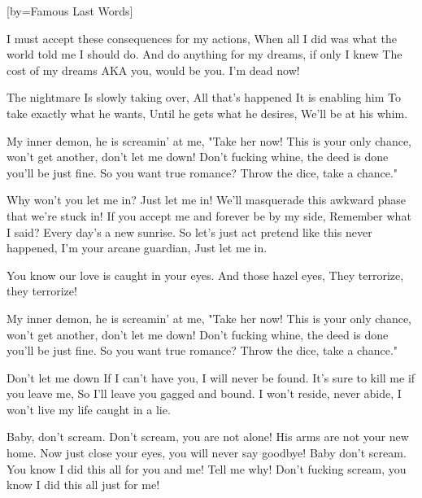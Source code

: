  

[by=Famous Last Words]




\beginverse
[Verse 1]
I must accept these consequences for my actions,
When all I did was what the world told me I should do.
And do anything for my dreams, if only I knew
The cost of my dreams AKA you, would be you.
I'm dead now!
\endverse

The nightmare
Is slowly taking over,
All that's happened
It is enabling him
To take exactly what he wants,
Until he gets what he desires,
We'll be at his whim.
\endchorus

\beginchorus
[Chorus]
My inner demon, he is screamin' at me, "Take her now!
This is your only chance, won't get another, don't let me down!
Don't fucking whine, the deed is done you'll be just fine.
So you want true romance? Throw the dice, take a chance."
\endchorus

\beginverse
[Verse 2]
Why won't you let me in? Just let me in!
We'll masquerade this awkward phase that we're stuck in!
If you accept me and forever be by my side,
Remember what I said? Every day's a new sunrise.
So let's just act pretend like this never happened,
I'm your arcane guardian,
Just let me in.
\endverse

You know our love is caught in your eyes.
And those hazel eyes,
They terrorize, they terrorize!
\endchorus

\beginverse
[Chorus]
My inner demon, he is screamin' at me, "Take her now!
This is your only chance, won't get another, don't let me down!
Don't fucking whine, the deed is done you'll be just fine.
So you want true romance? Throw the dice, take a chance."
\endverse

\beginchorus
[Hook]
Don't let me down
If I can't have you, I will never be found.
It's sure to kill me if you leave me,
So I'll leave you gagged and bound.
I won't reside, never abide,
I won't live my life caught in a lie.
\endchorus

\beginverse
Baby, don't scream.
Don't scream, you are not alone!
His arms are not your new home.
Now just close your eyes, you will never say goodbye!
Baby don't scream.
You know I did this all for you and me!
Tell me why!
Don't fucking scream, you know I did this all just for me!
\endverse

